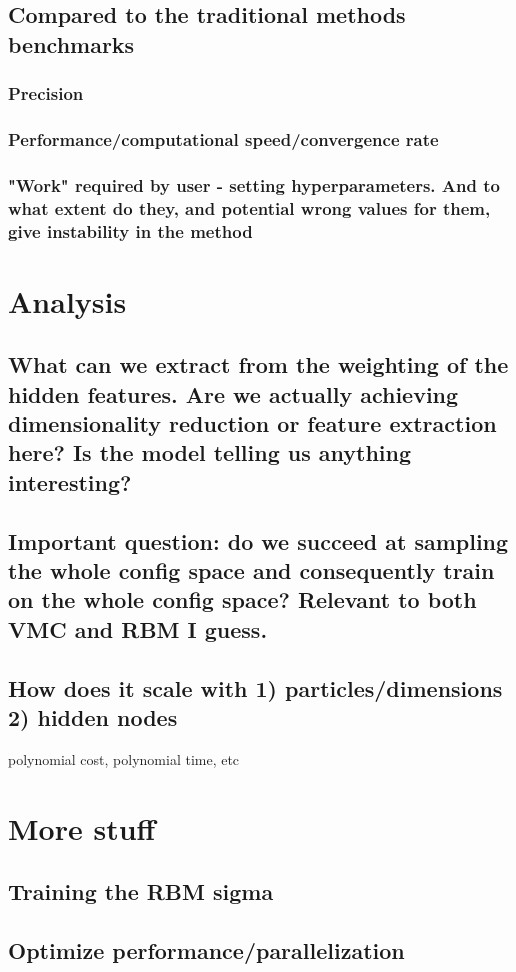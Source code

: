 \documentclass[twoside,english]{uiofysmaster}
\begin{document}
\subsection{Compared to the traditional methods benchmarks}
\subsubsection{Precision}
\subsubsection{Performance/computational speed/convergence rate}
\subsubsection{"Work" required by user - setting hyperparameters. And to what extent do they, and potential wrong values for them, give instability in the method}

\section{Analysis}
\subsection{What can we extract from the weighting of the hidden features. Are we actually achieving dimensionality reduction or feature extraction here? Is the model telling us anything interesting?}
\subsection{Important question: do we succeed at sampling the whole config space and consequently train on the whole config space? Relevant to both VMC and RBM I guess.}
\subsection{How does it scale with 1) particles/dimensions 2) hidden nodes}
polynomial cost, polynomial time, etc

\section{More stuff}
\subsection{Training the RBM sigma}
\subsection{Optimize performance/parallelization}
\end{document}
